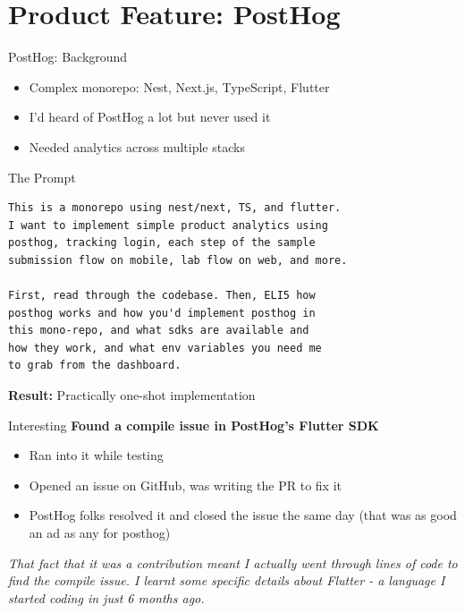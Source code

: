 \documentclass{beamer}
\begin{document}
\section{Product Feature: PostHog}


\begin{frame}{PostHog: Background}
    \pause
    \begin{itemize}[<+->]
        \item Complex monorepo: Nest, Next.js, TypeScript, Flutter
        \item I'd heard of PostHog a lot but never used it
        \item Needed analytics across multiple stacks
    \end{itemize}
\end{frame}

\begin{frame}[fragile]{The Prompt}
    \small
    \begin{lstlisting}
This is a monorepo using nest/next, TS, and flutter.
I want to implement simple product analytics using
posthog, tracking login, each step of the sample 
submission flow on mobile, lab flow on web, and more.

First, read through the codebase. Then, ELI5 how
posthog works and how you'd implement posthog in
this mono-repo, and what sdks are available and
how they work, and what env variables you need me
to grab from the dashboard.
    \end{lstlisting}

    \vspace{0.5em}
    \normalsize
    \textbf{Result:} Practically one-shot implementation
\end{frame}

\begin{frame}{Interesting}
    \textbf{Found a compile issue in PostHog's Flutter SDK}

    \vspace{1em}
    \begin{itemize}[<+->]
        \item Ran into it while testing
        \item Opened an issue on GitHub, was writing the PR to fix it
        \item PostHog folks resolved it and closed the issue the same day (that was as good an ad as any for posthog)
    \end{itemize}

    \vspace{1em}
    \onslide<+->
    \textit{That fact that it was a contribution meant I actually went through lines of code to find the compile issue. I learnt some specific details about Flutter - a language I started coding in just 6 months ago.}
\end{frame}
\end{document}

